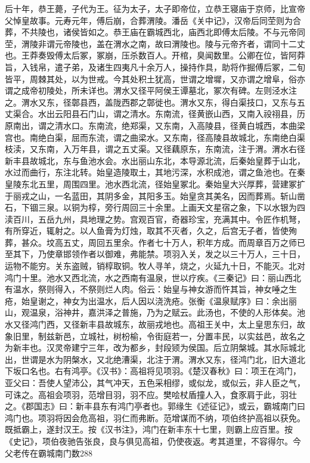 \documentclass[12pt,UTF8]{ctexbook}
\begin{document}
后十年，恭王薨，子代为王。征为太子，太子即帝位，立恭王寝庙于京师，比宣帝父悼皇故事。元寿元年，傅后崩，合葬渭陵。潘岳《关中记》，汉帝后同茔则为合葬，不共陵也，诸侯皆如之。恭王庙在霸城西北，庙西北即傅太后陵。不与元帝同茔，渭陵非谓元帝陵也，盖在渭水之南，故曰渭陵也。陵与元帝齐者，谓同十二丈也。王莽奏毁傅太后冢，冢崩，压杀数百人。开棺，臭闻数里。公卿在位，皆阿莽旨，入钱帛，遣子弟，及诸生四夷凡十余万人，操持作具，助将作掘傅后冢，二旬皆平，周棘其处，以为世戒。今其处积土犹高，世谓之增墀，又亦谓之增阜，俗亦谓之成帝初陵处，所未详也。渭水又径平阿侯王谭墓北，冢次有碑。左则泾水注之。渭水又东，径鄣县西，盖陇西郡之鄣徙也。渭水又东，得白渠技口，又东与五丈渠合。水出云阳县石门山，谓之清水。东南流，径黄嵌山西，又南入祋祤县，历原南出，谓之清水口。东南流，绝郑渠，又东南，入高陵县，径黄白城西，本曲梁宫也。南绝白渠，屈而东流，谓之曲梁水。又东南，径高陵县故城北，东南绝白渠枝渎，又东南，入万年县，谓之五丈渠。又径藕原东，东南流，注于渭。渭水右径新丰县故城北，东与鱼池水会。水出丽山东北，本导源北流，后秦始皇葬于山北，水过而曲行，东注北转。始皇造陵取土，其地污深，水积成池，谓之鱼池也。在秦皇陵东北五里，周围四里。池水西北流，径始皇冢北。秦始皇大兴厚葬，营建冢扩于丽戎之山，一名蓝田，其阴多金，其阳多玉。始皇贪其美名，因而葬焉。斩山凿石，下锢三泉。以铜为椁，旁行周回三十余里。上画天文星宿之象，下以水银为四渎百川，五岳九州，具地理之势。宫观百官，奇器珍宝，充满其中。令匠作机弩，有所穿近，辄射之。以人鱼膏为灯烛，取其不灭者，久之，后宫无子者，皆使殉葬，甚众。坟高五丈，周回五里余。作者七十万人，积年方成。而周章百万之师已至其下，乃使章邯领作者以御难，弗能禁。项羽入关，发之以三十万人，三十日，运物不能穷。关东盗贼，销椁取铜。牧人寻羊，烧之，火延九十日，不能灭。北对鸿门十里。池水又西北流，水之西南有温泉，世以疗疾。《三秦记》曰：丽山西北有温水，祭则得入，不祭则烂人肉。俗云：始皇与神女游而忤其旨，神女唾之生疮，始皇谢之，神女为出温水，后人因以浇洗疮。张衡《温泉赋序》曰：余出丽山，观温泉，浴神井，嘉洪泽之普施，乃为之赋云。此汤也，不使的人形体矣。池水又径鸿门西，又径新丰县故城东，故丽戎地也。高祖王关中，太上皇思东归，故象旧里，制兹新邑，立城社，树枌榆，令街庭若一，分置丰民，以实兹邑，故名之为新丰也。汉灵帝建宁三年，改为都乡，封段颎为侯国。后立阴槃城。其水际城北出，世谓是水为阴槃水，又北绝漕渠，北注于渭。渭水又东，径鸿门北，旧大道北下坂口名也。右有鸿亭。《汉书》：高祖将见项羽。《楚汉春秋》曰：项王在鸿门，亚父曰：吾使人望沛公，其气冲天，五色采相缪，或似龙，或似云，非人臣之气，可诛之。高祖会项羽，范增目羽，羽不应。樊哙杖盾撞人入，食豕肩于此，羽壮之。《郡国志》曰：新丰县东有鸿门亭者也。郭缘生《述征记》，或云，霸城南门曰鸿门也。项羽将因会危高祖，羽仁而弗断。范增谋而不纳，项伯终护高祖以获免。既抵霸上，遂封汉王。按《汉书注》，鸿门在新丰东十七里，则霸上应百里。按《史记》，项伯夜驰告张良，良与俱见高祖，仍使夜返。考其道里，不容得尔。今父老传在霸城南门数288 
\end{document}
